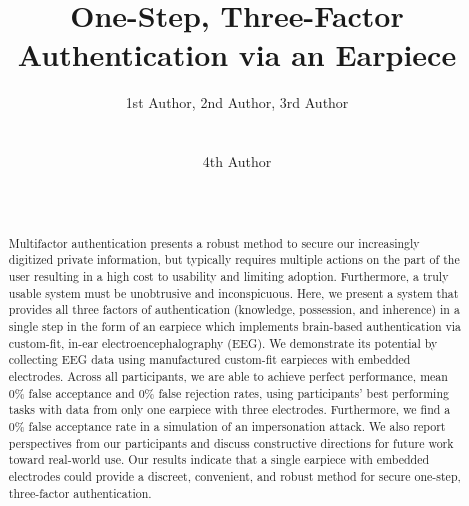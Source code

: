 \documentclass{sigchi}
\begin{document}
\title{One-Step, Three-Factor Authentication via an Earpiece}

\author{
  \alignauthor 1st Author, 2nd Author, 3rd Author\\
    \\
    \\
  \alignauthor 4th Author\\
    \\
    \\
}

\maketitle

\begin{abstract}
 Multifactor authentication presents a robust method to secure our increasingly digitized private information, but typically requires multiple actions on the part of the user resulting in a high cost to usability and limiting adoption. Furthermore, a truly usable system must be unobtrusive and inconspicuous. Here, we present a system that provides all three factors of authentication (knowledge, possession, and inherence) in a single step in the form of an earpiece which implements brain-based authentication via custom-fit, in-ear electroencephalography (EEG). We demonstrate its potential by collecting EEG data using manufactured custom-fit earpieces with embedded electrodes. Across all participants, we are able to achieve perfect performance, mean 0\% false acceptance and 0\% false rejection rates, using participants' best performing tasks with data from only one earpiece with three electrodes. Furthermore, we find a 0\% false acceptance rate in a simulation of an impersonation attack. We also report perspectives from our participants and discuss constructive directions for future work toward real-world use. Our results indicate that a single earpiece with embedded electrodes could provide a discreet, convenient, and robust method for secure one-step, three-factor authentication.
\end{abstract}



\end{document}
